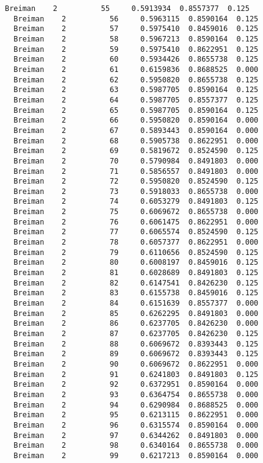 \documentclass[11pt]{article}
\begin{document}
\begin{Verbatim}[commandchars=\\\{\}]
  Breiman    2          55     0.5913934  0.8557377  0.125
  Breiman    2          56     0.5963115  0.8590164  0.125
  Breiman    2          57     0.5975410  0.8459016  0.125
  Breiman    2          58     0.5967213  0.8590164  0.125
  Breiman    2          59     0.5975410  0.8622951  0.125
  Breiman    2          60     0.5934426  0.8655738  0.125
  Breiman    2          61     0.6159836  0.8688525  0.000
  Breiman    2          62     0.5950820  0.8655738  0.125
  Breiman    2          63     0.5987705  0.8590164  0.125
  Breiman    2          64     0.5987705  0.8557377  0.125
  Breiman    2          65     0.5987705  0.8590164  0.125
  Breiman    2          66     0.5950820  0.8590164  0.000
  Breiman    2          67     0.5893443  0.8590164  0.000
  Breiman    2          68     0.5905738  0.8622951  0.000
  Breiman    2          69     0.5819672  0.8524590  0.125
  Breiman    2          70     0.5790984  0.8491803  0.000
  Breiman    2          71     0.5856557  0.8491803  0.000
  Breiman    2          72     0.5950820  0.8524590  0.125
  Breiman    2          73     0.5918033  0.8655738  0.000
  Breiman    2          74     0.6053279  0.8491803  0.125
  Breiman    2          75     0.6069672  0.8655738  0.000
  Breiman    2          76     0.6061475  0.8622951  0.000
  Breiman    2          77     0.6065574  0.8524590  0.125
  Breiman    2          78     0.6057377  0.8622951  0.000
  Breiman    2          79     0.6110656  0.8524590  0.125
  Breiman    2          80     0.6008197  0.8459016  0.125
  Breiman    2          81     0.6028689  0.8491803  0.125
  Breiman    2          82     0.6147541  0.8426230  0.125
  Breiman    2          83     0.6155738  0.8459016  0.125
  Breiman    2          84     0.6151639  0.8557377  0.000
  Breiman    2          85     0.6262295  0.8491803  0.000
  Breiman    2          86     0.6237705  0.8426230  0.000
  Breiman    2          87     0.6237705  0.8426230  0.125
  Breiman    2          88     0.6069672  0.8393443  0.125
  Breiman    2          89     0.6069672  0.8393443  0.125
  Breiman    2          90     0.6069672  0.8622951  0.000
  Breiman    2          91     0.6241803  0.8491803  0.125
  Breiman    2          92     0.6372951  0.8590164  0.000
  Breiman    2          93     0.6364754  0.8655738  0.000
  Breiman    2          94     0.6290984  0.8688525  0.000
  Breiman    2          95     0.6213115  0.8622951  0.000
  Breiman    2          96     0.6315574  0.8590164  0.000
  Breiman    2          97     0.6344262  0.8491803  0.000
  Breiman    2          98     0.6340164  0.8655738  0.000
  Breiman    2          99     0.6217213  0.8590164  0.000

\end{Verbatim}
\end{document}
